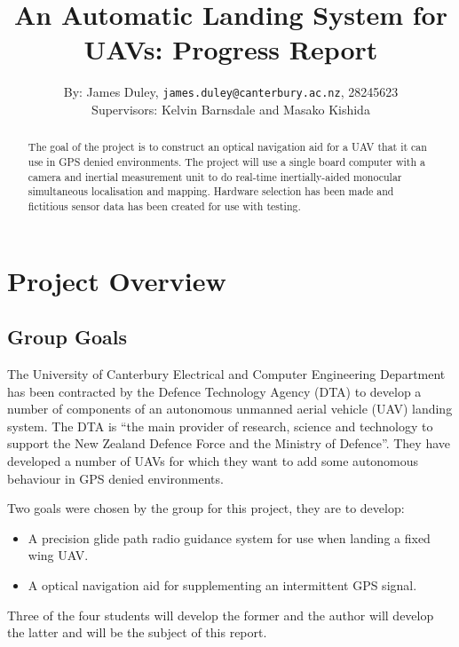 \documentclass[a4paper,12pt]{article}
\begin{document}
\title{An Automatic Landing System for UAVs: Progress Report}
\author{By: James Duley, \texttt{james.duley@canterbury.ac.nz}, 28245623\\Supervisors: Kelvin Barnsdale and Masako Kishida}
\maketitle
\thispagestyle{empty}
\newpage
\begin{abstract}
	The goal of the project is to construct an optical navigation aid for a UAV that it can use in GPS denied environments. The project will use a single board computer with a camera and inertial measurement unit to do real-time inertially-aided monocular simultaneous localisation and mapping. 
	Hardware selection has been made and fictitious sensor data has been created for use with testing.
\end{abstract}
\newpage

\tableofcontents
\newpage


\section{Project Overview\label{sec:overview}}
\subsection{Group Goals}
The University of Canterbury Electrical and Computer Engineering Department has been contracted by the Defence Technology Agency (DTA) to develop a number of components of an autonomous unmanned aerial vehicle (UAV) landing system. The DTA is ``the main provider of research, science and technology to support the New Zealand Defence Force and the Ministry of Defence''. They have developed a number of UAVs for which they want to add some autonomous behaviour in GPS denied environments.

Two goals were chosen by the group for this project, they are to develop:
\begin{itemize}
	\item A precision glide path radio guidance system for use when landing a fixed wing UAV.
	\item A optical navigation aid for supplementing an intermittent GPS signal.
\end{itemize}
Three of the four students will develop the former and the author will develop the latter and will be the subject of this report.
\end{document}
